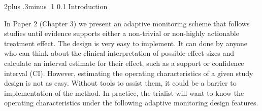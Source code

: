\documentclass[12pt,oneside]{book}
\makeatletter
\newlength{\li}\setlength{\li}{14.48pt}
\newlength{\di}\setlength{\di}{-3.5mm}
\renewcommand\section{ \@startsection {section}{1}{\z@}%
    {2\@bls  plus .3\@bls minus .1\@bls}%
    {0.1\@bls}%
    {\centering\normalfont}}
\theoremstyle{definition}
\theoremstyle{definition}
\theoremstyle{definition}
\theoremstyle{remark}
\makeatother
\begin{document}
\hypertarget{introduction-3}{%
\section{Introduction}\label{introduction-3}}

In Paper 2 (Chapter 3) we present an adaptive monitoring scheme that
follows studies until evidence supports either a non-trivial or
non-highly actionable treatment effect. The design is very easy to
implement. It can done by anyone who can think about the clinical
interpretation of possible effect sizes and calculate an interval
estimate for their effect, such as a support or confidence interval
(CI). However, estimating the operating characteristics of a given study
design is not as easy. Without tools to assist them, it could be a
barrier to implementation of the method. In practice, the trialist will
want to know the operating characteristics under the following adaptive
monitoring design features.
\end{document}
